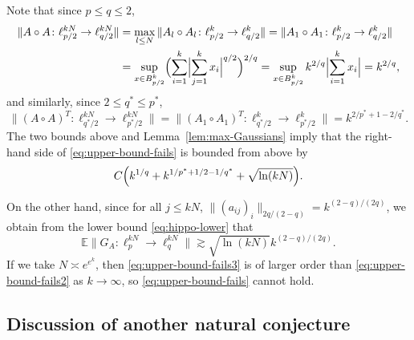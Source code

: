 \documentclass[a4paper]{amsart}
\theoremstyle{definition}
\theoremstyle{remark}
\numberwithin{equation}{section}
\newcommand*{\EE}{\mathbb{E}}
\newcommand*{\hadprod}{\mathbin{\circ}} %
\begin{document}
Note that since $p\le q \le 2$,
\begin{align*}
	\|A\hadprod A \colon \ell^{kN}_{p/2} \to \ell^{kN}_{q/2} \| 
	&= \max_{l\le N} \|A_l\hadprod A_l \colon \ell^{k}_{p/2} \to \ell^{k}_{q/2} \| 
	= \|A_1\hadprod A_1 \colon \ell^{k}_{p/2} \to \ell^{k}_{q/2} \|
	\\
	& =\sup_{x\in B_{p/2}^k}  \Bigl( \sum_{i=1}^k \Bigl| \sum_{j=1}^k x_i \Bigr|^{q/2} \Bigr)^{2/q} 
	=\sup_{x\in B_{p/2}^k} k^{2/q} \Bigl| \sum_{i=1}^k x_i \Bigr| = k^{2/q},
\end{align*}
and similarly, since $2\le q^\ast\le p^{\ast}$,
\begin{equation*}
	\|(A\hadprod A)^T \colon \ell^{kN}_{q^\ast/2} \to \ell^{kN}_{p^\ast/2} \| 
	=  \|(A_1\hadprod A_1)^T \colon \ell^{k}_{q^\ast/2} \to \ell^{k}_{p^\ast/2} \| 
	= k^{2/p^\ast+1-2/q^\ast}.
\end{equation*}
The two bounds above and Lemma~\ref{lem:max-Gaussians} imply that the right-hand side of \eqref{eq:upper-bound-fails} is bounded from above by 
\begin{equation}	\label{eq:upper-bound-fails2}
	C \Bigl( k^{1/q}+k^{1/p^\ast+1/2-1/q^\ast} + \sqrt{\ln (kN)} \Bigr).
\end{equation}

On the other hand, since for all $j\le kN$, $\|(a_{ij})_{i} \|_{2q/(2-q)} = k^{(2-q)/(2q)}$, we obtain from the lower bound \eqref{eq:hippo-lower} that 
\begin{equation}	\label{eq:upper-bound-fails3}
	\EE \|G_A\colon \ell_p^{kN}\to \ell_q^{kN}\| \gtrsim \sqrt{\ln (kN)}  k^{(2-q)/(2q)}.
\end{equation}
If we take $N\asymp e^{e^k}$, then \eqref{eq:upper-bound-fails3} is of larger order than \eqref{eq:upper-bound-fails2} as $k\to \infty$, so \eqref{eq:upper-bound-fails} cannot hold.

\subsection{Discussion of another natural conjecture} \label{subsect:conj-wrong}
\end{document}
